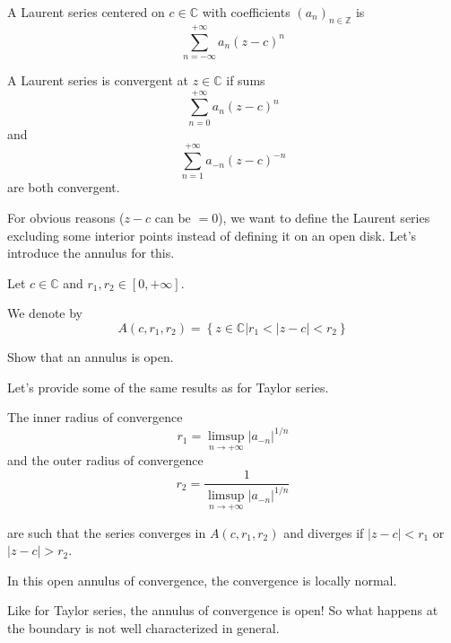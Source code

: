 \begin{defi}
    A Laurent series centered on $c\in\mathbb{C}$ with coefficients $(a_n)_{n\in\mathbb{Z}}$ is 
    $$ \sum_{n=-\infty}^{+\infty}a_n(z-c)^n$$
\end{defi}

\begin{defi}
    A Laurent series is convergent at $z\in\mathbb{C}$ if sums
    $$ \sum_{n=0}^{+\infty}a_n(z-c)^n$$
    and
    $$ \sum_{n=1}^{+\infty}a_{-n}(z-c)^{-n}$$
    are both convergent.
\end{defi}

For obvious reasons ($z-c$ can be $= 0$), we want to define the Laurent series excluding some interior points instead of defining it on an open disk. Let's introduce the annulus for this.

\begin{defi}
    [Annulus]
    Let $c\in\mathbb{C}$ and $r_1, r_2 \in [0, + \infty]$.

    We denote by 
    $$A(c, r_1, r_2) = \left\lbrace z\in\mathbb{C} \vert r_1 < | z-c | < r_2 \right \rbrace $$
\end{defi}
\begin{exo}
    Show that an annulus is open.
\end{exo}

Let's provide some of the same results as for Taylor series.

\begin{thm*}
    The inner radius of convergence 
    $$r_1  = \limsup_{n\rightarrow + \infty}|a_{-n}|^{1/n} $$
    and the outer radius of convergence
    $$r_2  = \frac{1}{\limsup_{n\rightarrow + \infty}|a_{-n}|^{1/n}} $$

    are such that the series converges in $A(c, r_1, r_2)$ and diverges if $|z-c| < r_1$ or $|z-c| > r_2$.

    In this open annulus of convergence, the convergence is locally normal.
\end{thm*}

\begin{note}
    Like for Taylor series, the annulus of convergence is open! So what happens at the boundary is not well characterized in general.
\end{note}

